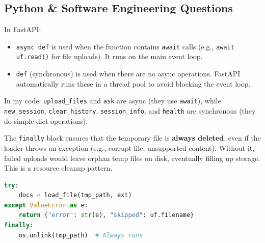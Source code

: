 \documentclass[12pt,a4paper]{article}
\begin{document}
\subsection{Python \& Software Engineering Questions}

\begin{interviewbox}
\end{interviewbox}
\begin{answerbox}
In FastAPI:
\begin{itemize}
  \item \texttt{async def} is used when the function contains \texttt{await} calls (e.g., \texttt{await uf.read()} for file uploads). It runs on the main event loop.
  \item \texttt{def} (synchronous) is used when there are no async operations. FastAPI automatically runs these in a thread pool to avoid blocking the event loop.
\end{itemize}
In my code: \texttt{upload\_files} and \texttt{ask} are async (they use \texttt{await}), while \texttt{new\_session}, \texttt{clear\_history}, \texttt{session\_info}, and \texttt{health} are synchronous (they do simple dict operations).
\end{answerbox}

\begin{interviewbox}
\end{interviewbox}
\begin{answerbox}
The \texttt{finally} block ensures that the temporary file is \textbf{always deleted}, even if the loader throws an exception (e.g., corrupt file, unsupported content). Without it, failed uploads would leave orphan temp files on disk, eventually filling up storage. This is a resource cleanup pattern.

\begin{lstlisting}[language=Python]
try:
    docs = load_file(tmp_path, ext)
except ValueError as e:
    return {"error": str(e), "skipped": uf.filename}
finally:
    os.unlink(tmp_path)  # Always runs
\end{lstlisting}
\end{answerbox}
\end{document}
